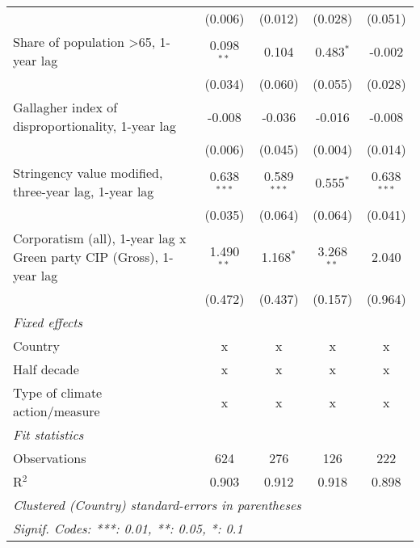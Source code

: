 \begin{table}[htbp]
\begin{tabular}{lcccc}
                                                                          & (0.006)       & (0.012)         & (0.028)         & (0.051)\\   
      Share of population >65, 1-year lag                                 & 0.098$^{**}$  & 0.104           & 0.483$^{*}$     & -0.002\\   
                                                                          & (0.034)       & (0.060)         & (0.055)         & (0.028)\\   
      Gallagher index of disproportionality, 1-year lag                   & -0.008        & -0.036          & -0.016          & -0.008\\   
                                                                          & (0.006)       & (0.045)         & (0.004)         & (0.014)\\   
      Stringency value modified, three-year lag, 1-year lag               & 0.638$^{***}$ & 0.589$^{***}$   & 0.555$^{*}$     & 0.638$^{***}$\\   
                                                                          & (0.035)       & (0.064)         & (0.064)         & (0.041)\\   
      Corporatism (all), 1-year lag x Green party CIP (Gross), 1-year lag & 1.490$^{**}$  & 1.168$^{*}$     & 3.268$^{**}$    & 2.040\\   
                                                                          & (0.472)       & (0.437)         & (0.157)         & (0.964)\\   
      \emph{Fixed effects}\\
      Country                                                             & x             & x               & x               & x\\  
      Half decade                                                         & x             & x               & x               & x\\  
      Type of climate action/measure                                      & x             & x               & x               & x\\  
      \midrule \emph{Fit statistics}\\
      Observations                                                        & 624           & 276             & 126             & 222\\  
      R$^2$                                                               & 0.903         & 0.912           & 0.918           & 0.898\\  
      \midrule
      \multicolumn{5}{l}{\emph{Clustered (Country) standard-errors in parentheses}}\\
      \multicolumn{5}{l}{\emph{Signif. Codes: ***: 0.01, **: 0.05, *: 0.1}}\\
   \end{tabular}
\end{table}



